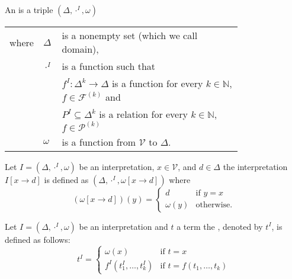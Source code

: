 \begin{definition}
An  is a triple $(\Delta,\cdot^I,\omega)$
\begin{tabular}{llp{0.78\linewidth}}
		where & $\Delta$      & is a nonempty set (which we call  domain),                                                                                                       \\
		      & $\cdot^I$ & is a function such that\\
		      & & $f^I:\Delta^k\to\Delta$  is a function for every $k\in\mathbb{N}$, $f\in\mathcal{F}^{(k)}$ and \\
		      & & $P^I\subseteq\Delta^k$ is a relation for every $k\in\mathbb{N}$, $f\in\mathcal{P}^{(k)}$ \\
		      & $\omega$ & is a function from $\mathcal{V}$ to $\Delta$.                       
	\end{tabular}
\end{definition}
Let $I=(\Delta,\cdot^I,\omega)$ be an interpretation, $x\in\mathcal{V}$, and $d\in\Delta$ the interpretation $I\left[x\to d\right]$ is defined as $(\Delta,\cdot^I,\omega\left[x\to d\right])$ where
\[(\omega\left[x\to d\right])(y)=
\begin{cases}
d & \text{if $y=x$}\\
\omega(y) & \text{otherwise.}
\end{cases}\]
\begin{definition}
Let $I=(\Delta,\cdot^I,\omega)$ be an interpretation and $t$ a term the , denoted by $t^I$, is defined as follows:
\[t^I=
\begin{cases}
\omega(x) & \text{if $t=x$}\\
f^I(t^I_1,\dots,t^I_k) & \text{if $t=f(t_1,\dots,t_k)$}
\end{cases}\]
\end{definition}
